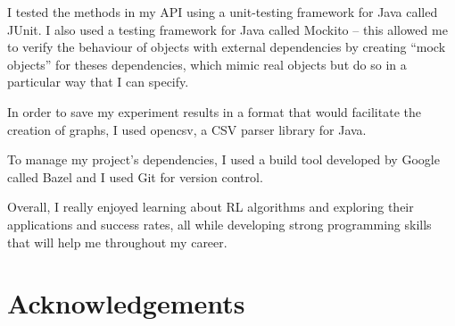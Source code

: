 \documentclass[11pt,a4paper]{report}
\begin{document}
I tested the methods in my API using a unit-testing framework for Java called JUnit. I also used a testing framework for Java called Mockito – this allowed me to verify the behaviour of objects with external dependencies by creating “mock objects” for theses dependencies, which mimic real objects but do so in a particular way that I can specify.

In order to save my experiment results in a format that would facilitate the creation of graphs, I used opencsv, a CSV parser library for Java.

To manage my project’s dependencies, I used a build tool developed by Google called Bazel and I used Git for version control.

Overall, I really enjoyed learning about RL algorithms and exploring their applications and success rates, all while developing strong programming skills that will help me throughout my career.


\chapter{Acknowledgements}



{}

\end{document}
